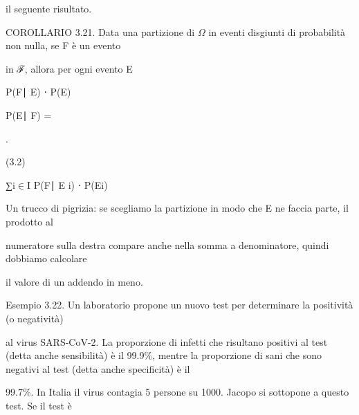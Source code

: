 \documentclass[a4paper,portrait,12pt]{article}
\begin{document}
\begin{flushleft}
il seguente risultato.
\end{flushleft}


\begin{flushleft}
COROLLARIO 3.21. Data una partizione di $\Omega$ in eventi disgiunti di probabilit\`{a} non nulla, se F \`{e} un evento
\end{flushleft}


\begin{flushleft}
in ℱ, allora per ogni evento E
\end{flushleft}


\begin{flushleft}
P(F∣ E) ⋅ P(E)
\end{flushleft}


\begin{flushleft}
P(E∣ F) =
\end{flushleft}


.


(3.2)


\begin{flushleft}
∑i$\in$I P(F∣ E i) ⋅ P(Ei)
\end{flushleft}


\begin{flushleft}
Un trucco di pigrizia: se scegliamo la partizione in modo che E ne faccia parte, il prodotto al
\end{flushleft}


\begin{flushleft}
numeratore sulla destra compare anche nella somma a denominatore, quindi dobbiamo calcolare
\end{flushleft}


\begin{flushleft}
il valore di un addendo in meno.
\end{flushleft}


\begin{flushleft}
Esempio 3.22. Un laboratorio propone un nuovo test per determinare la positivit\`{a} (o negativit\`{a})
\end{flushleft}


\begin{flushleft}
al virus SARS-CoV-2. La proporzione di infetti che risultano positivi al test (detta anche sensibilit\`{a}) \`{e} il 99.9\%, mentre la proporzione di sani che sono negativi al test (detta anche specificit\`{a}) \`{e} il
\end{flushleft}


\begin{flushleft}
99.7\%. In Italia il virus contagia 5 persone su 1000. Jacopo si sottopone a questo test. Se il test \`{e}
\end{flushleft}
\end{document}
